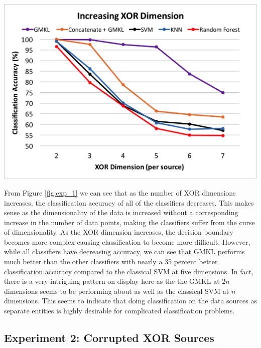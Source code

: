 \documentclass{article}
\begin{document}
\begin{minipage}{\textwidth}
\centering
\includegraphics[scale=0.4]{experimentpic1.png}
\label{fig:exp_1}
\end{minipage}


From Figure \ref{fig:exp_1} we can see that as the number of XOR dimensions increases, the classification accuracy of all of the classifiers decreases. This makes sense as the dimensionality of the data is increased without a corresponding increase in the number of data points, making the classifiers suffer from the curse of dimensionality. As the XOR dimension increases, the decision boundary becomes more complex causing classification to become more difficult. However, while all classifiers have decreasing accuracy, we can see that GMKL performs much better than the other classifiers with nearly a 35 percent better classification accuracy compared to the classical SVM at five dimensions. In fact, there is a very intriguing pattern on display here as the the GMKL at $2n$ dimensions seems to be performing about as well as the classical SVM at $n$ dimensions. This seems to indicate that doing classification on the data sources as separate entities is highly desirable for complicated classification problems.











\subsection*{Experiment 2: Corrupted XOR Sources}
\end{document}
